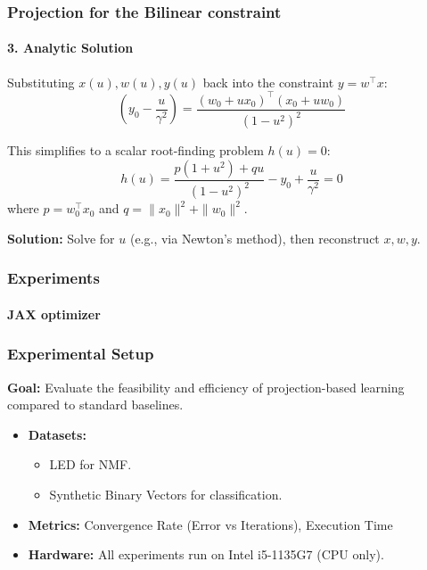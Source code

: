 \documentclass[t, xcolor=table, aspectratio=169]{beamer}
\begin{document}
    \begin{frame}
        \frametitle{Projection for the Bilinear constraint}
        \framesubtitle{3. Analytic Solution}
        Substituting $x(u), w(u), y(u)$ back into the constraint $ y = w^\top x$:
        \begin{equation*}
         \left(y_0 - \frac{u}{\gamma^2}\right) = \frac{(w_0 + u x_0)^\top (x_0 + u w_0)}{(1-u^2)^2}
        \end{equation*}
        
        This simplifies to a scalar root-finding problem $h(u) = 0$:
        \begin{equation*}
            h(u) = \frac{p(1+u^2) + q u}{(1-u^2)^2} -y_0 + \frac{u}{\gamma^2} = 0
        \end{equation*}
        where $p = w_0^\top x_0$ and $q = \|x_0\|^2 + \|w_0\|^2$.
        \vspace{1em}
        
        \textbf{Solution:} Solve for $u$ (e.g., via Newton's method), then reconstruct $x, w, y$.
    \end{frame}


    \begin{frame}
        \frametitle{Experiments}
        \framesubtitle{JAX optimizer}
    \end{frame}

    \begin{frame}
        \frametitle{Experimental Setup}
        \textbf{Goal:} Evaluate the feasibility and efficiency of projection-based learning compared to standard baselines.
        \vspace{1em}
        \begin{itemize}
            \item \textbf{Datasets:}
            \begin{itemize}
                \item LED for NMF.
                \item Synthetic Binary Vectors for classification.
            \end{itemize}
            \item \textbf{Metrics:} Convergence Rate (Error vs Iterations), Execution Time
            \item \textbf{Hardware:} All experiments run on Intel i5-1135G7 (CPU only).
        \end{itemize}
    \end{frame}
\end{document}
